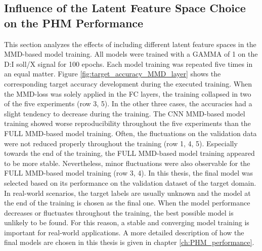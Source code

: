 \subsection{Influence of the Latent Feature Space Choice on the PHM Performance}\label{ch:Influence_Layer_real_dataset}
This section analyzes the effects of including different latent feature spaces in the MMD-based model training. All models were trained with a GAMMA of 1 on the D:I soll/X signal for 100 epochs. Each model training was repeated five times in an equal matter. Figure \ref{fig:target_accuracy_MMD_layer} shows the corresponding target accuracy development during the executed training. When the MMD-loss was solely applied in the FC layers, the training collapsed in two of the five experiments (row 3, 5). In the other three cases, the accuracies had a slight tendency to decrease during the training. The CNN MMD-based model training showed worse reproducibility throughout the five experiments than the FULL MMD-based model training. Often, the fluctuations on the validation data were not reduced properly throughout the training (row 1, 4, 5). Especially towards the end of the training, the FULL MMD-based model training appeared to be more stable. Nevertheless, minor fluctuations were also observable for the FULL MMD-based model training (row 3, 4). In this thesis, the final model was selected based on its performance on the validation dataset of the target domain. In real-world scenarios, the target labels are usually unknown and the model at the end of the training is chosen as the final one. When the model performance decreases or fluctuates throughout the training, the best possible model is unlikely to be found. For this reason, a stable and converging model training is important for real-world applications. A more detailed description of how the final models are chosen in this thesis is given in chapter \ref{ch:PHM_performance}. 

